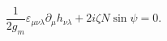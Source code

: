 \begin{equation}
\label{SSP2}
\frac{1}{2g_m}\varepsilon_{\mu\nu\lambda}\partial_\mu h_{\nu\lambda}+2i\zeta N\sin\psi=0.
\end{equation}

